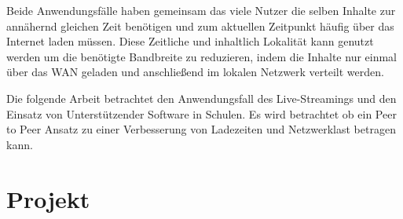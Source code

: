 Beide Anwendungsfälle haben gemeinsam das viele Nutzer die selben Inhalte zur annähernd gleichen Zeit benötigen und zum aktuellen Zeitpunkt häufig über das Internet laden müssen. Diese Zeitliche und inhaltlich Lokalität kann genutzt werden um die benötigte Bandbreite zu reduzieren, indem die Inhalte nur einmal über das WAN geladen und anschließend im lokalen Netzwerk verteilt werden.

Die folgende Arbeit betrachtet den Anwendungsfall des Live-Streamings und den Einsatz von Unterstützender Software in Schulen. Es wird betrachtet ob ein Peer to Peer Ansatz zu einer Verbesserung von Ladezeiten und Netzwerklast betragen kann.
 




\section{Projekt \schulCloud}

